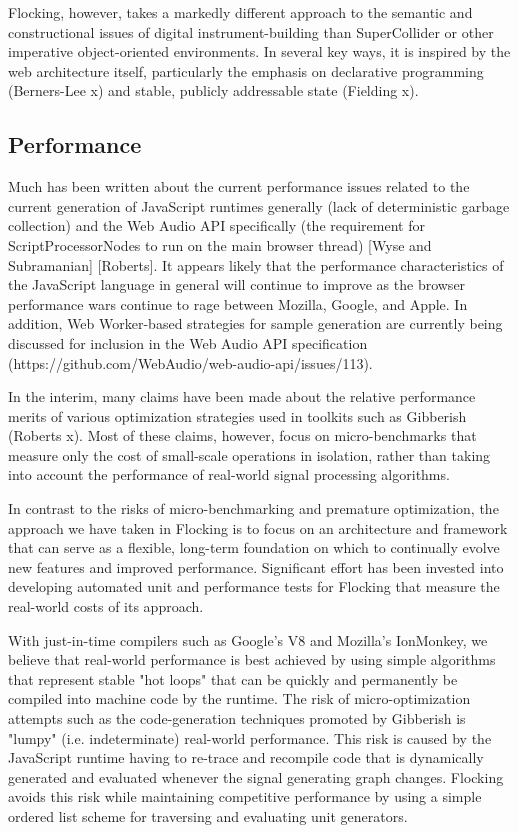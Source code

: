 \documentclass{article}
\begin{document}
Flocking, however, takes a markedly different approach to the semantic and constructional issues of digital instrument-building than SuperCollider or other imperative object-oriented environments. In several key ways, it is inspired by the web architecture itself, particularly the emphasis on declarative programming (Berners-Lee x) and stable, publicly addressable state (Fielding x).

\subsection{Performance}

Much has been written about the current performance issues related to the current generation of JavaScript runtimes generally (lack of deterministic garbage collection) and the Web Audio API specifically (the requirement for ScriptProcessorNodes to run on the main browser thread) [Wyse and Subramanian] [Roberts]. It appears likely that the performance characteristics of the JavaScript language in general will continue to improve as the browser performance wars continue to rage between Mozilla, Google, and Apple. In addition, Web Worker-based strategies for sample generation are currently being discussed for inclusion in the Web Audio API specification (https://github.com/WebAudio/web-audio-api/issues/113).

In the interim, many claims have been made about the relative performance merits of various optimization strategies used in toolkits such as Gibberish (Roberts x). Most of these claims, however, focus on micro-benchmarks that measure only the cost of small-scale operations in isolation, rather than taking into account the performance of real-world signal processing algorithms.

In contrast to the risks of micro-benchmarking and premature optimization, the approach we have taken in Flocking is to focus on an architecture and framework that can serve as a flexible, long-term foundation on which to continually evolve new features and improved performance. Significant effort has been invested into developing automated unit and performance tests for Flocking that measure the real-world costs of its approach.

With just-in-time compilers such as Google's V8 and Mozilla's IonMonkey, we believe that real-world performance is best achieved by using simple algorithms that represent stable "hot loops" that can be quickly and permanently be compiled into machine code by the runtime. The risk of micro-optimization attempts such as the code-generation techniques promoted by Gibberish is "lumpy" (i.e. indeterminate) real-world performance. This risk is caused by the JavaScript runtime having to re-trace and recompile code that is dynamically generated and evaluated whenever the signal generating graph changes. Flocking avoids this risk while maintaining competitive performance by using a simple ordered list scheme for traversing and evaluating unit generators.
\end{document}
